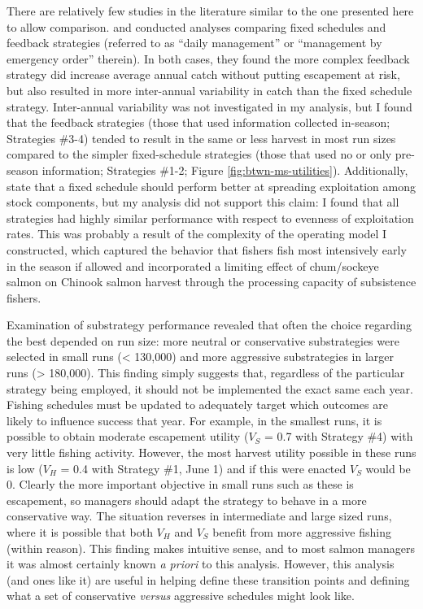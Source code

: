 \documentclass[12pt,]{book}
\theoremstyle{definition}
\theoremstyle{definition}
\theoremstyle{definition}
\theoremstyle{remark}
\begin{document}
There are relatively few studies in the literature similar to the one
presented here to allow comparison. \citet{carney-adkison-2014a} and
\citet{carney-adkison-2014b} conducted analyses comparing fixed
schedules and feedback strategies (referred to as ``daily management''
or ``management by emergency order'' therein). In both cases, they found
the more complex feedback strategy did increase average annual catch
without putting escapement at risk, but also resulted in more
inter-annual variability in catch than the fixed schedule strategy.
Inter-annual variability was not investigated in my analysis, but I
found that the feedback strategies (those that used information
collected in-season; Strategies \#3-4) tended to result in the same or
less harvest in most run sizes compared to the simpler fixed-schedule
strategies (those that used no or only pre-season information;
Strategies \#1-2; Figure \ref{fig:btwn-ms-utilities}). Additionally,
\citet{carney-adkison-2014a} state that a fixed schedule should perform
better at spreading exploitation among stock components, but my analysis
did not support this claim: I found that all strategies had highly
similar performance with respect to evenness of exploitation rates. This
was probably a result of the complexity of the operating model I
constructed, which captured the behavior that fishers fish most
intensively early in the season if allowed and incorporated a limiting
effect of chum/sockeye salmon on Chinook salmon harvest through the
processing capacity of subsistence fishers.

Examination of substrategy performance revealed that often the choice
regarding the best depended on run size: more neutral or conservative
substrategies were selected in small runs (\textless{} 130,000) and more
aggressive substrategies in larger runs (\textgreater{} 180,000). This
finding simply suggests that, regardless of the particular strategy
being employed, it should not be implemented the exact same each year.
Fishing schedules must be updated to adequately target which outcomes
are likely to influence success that year. For example, in the smallest
runs, it is possible to obtain moderate escapement utility (\(V_S\) =
0.7 with Strategy \#4) with very little fishing activity. However, the
most harvest utility possible in these runs is low (\(V_H\) = 0.4 with
Strategy \#1, June 1) and if this were enacted \(V_S\) would be 0.
Clearly the more important objective in small runs such as these is
escapement, so managers should adapt the strategy to behave in a more
conservative way. The situation reverses in intermediate and large sized
runs, where it is possible that both \(V_H\) and \(V_S\) benefit from
more aggressive fishing (within reason). This finding makes intuitive
sense, and to most salmon managers it was almost certainly known \emph{a
priori} to this analysis. However, this analysis (and ones like it) are
useful in helping define these transition points and defining what a set
of conservative \emph{versus} aggressive schedules might look like.
\end{document}
